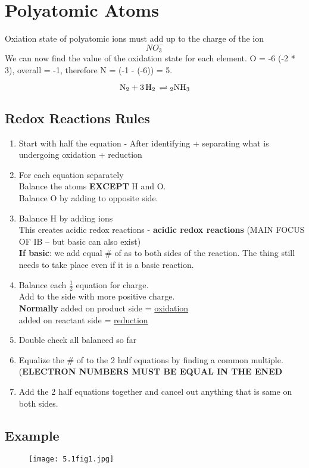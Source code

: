 \documentclass{article}
\begin{document}
\section{Polyatomic Atoms}
Oxiation state of polyatomic ions must add up to the charge of the ion $$NO_{3}^{-}$$We can now find the value of the oxidation state for each element. O = -6 (-2 * 3), overall = -1, therefore N = (-1 - (-6)) = 5.

$$\ce{N2 + 3H2 \rightleftharpoons 2NH3}$$

\pagebreak
\subsection{Redox Reactions Rules}
\begin{enumerate}
\item Start with half the equation - After identifying + separating what is undergoing oxidation + reduction
\item For each equation separately\\Balance the atoms \textbf{EXCEPT} H and O.\\Balance O by adding  to opposite side.
\item Balance H by adding  ions\\This creates acidic redox reactions - \textbf{acidic redox reactions} (MAIN FOCUS OF IB -- but basic can also exist)\\ \textbf{If basic}: we add equal \# of  as  to both sides of the reaction. The  thing still needs to take place even if it is a basic reaction. 
\item Balance each $\frac{1}{2}$ equation for charge. \\Add {} to the side with more positive charge. \\\textbf{Normally}  added on product side = \underline{oxidation}\\ added on reactant side = \underline{reduction}
\item Double check all balanced so far
\item Equalize the \# of  to the 2 half equations by finding a common multiple. (\textbf{ELECTRON NUMBERS MUST BE EQUAL IN THE ENED}
\item Add the 2 half equations together and cancel out anything that is same on both sides.
\end{enumerate}

\subsection{Example}
\begin{figure}[H]
\texttt{[image: 5.1fig1.jpg]}
\end{figure}
\end{document}
